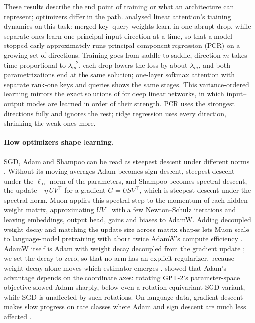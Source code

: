 These results describe the end point of training or what an architecture can represent; optimizers differ in the path. \citet{zhang2025training} analysed linear attention's training dynamics on this task: merged key--query weights learn in one abrupt drop, while separate ones learn one principal input direction at a time, so that a model stopped early approximately runs principal component regression (PCR) on a growing set of directions. Training goes from saddle to saddle, direction $m$ takes time proportional to $\lambda_m^{-2}$, each drop lowers the loss by about $\lambda_m$, and both parametrizations end at the same solution; one-layer softmax attention with separate rank-one keys and queries shows the same stages. This variance-ordered learning mirrors the exact solutions of \citet{saxe2014} for deep linear networks, in which input--output modes are learned in order of their strength. PCR uses the strongest directions fully and ignores the rest; ridge regression uses every direction, shrinking the weak ones more.

\paragraph{How optimizers shape learning.} SGD, Adam and Shampoo \citep{gupta2018shampoo} can be read as steepest descent under different norms \citep{bernstein2024old}. Without its moving averages Adam becomes sign descent, steepest descent under the $\ell_\infty$ norm of the parameters, and Shampoo becomes spectral descent, the update $-\eta\,UV^\top$ for a gradient $G = USV^\top$, which is steepest descent under the spectral norm. Muon \citep{jordan2024muon} applies this spectral step to the momentum of each hidden weight matrix, approximating $UV^\top$ with a few Newton--Schulz iterations and leaving embeddings, output head, gains and biases to AdamW. Adding decoupled weight decay and matching the update size across matrix shapes lets Muon scale to language-model pretraining with about twice AdamW's compute efficiency \citep{liu2025muon}. AdamW itself is Adam with weight decay decoupled from the gradient update \citep{loshchilov2019}; we set the decay to zero, so that no arm has an explicit regularizer, because weight decay alone moves which estimator emerges \citep{raventos2023}. \citet{xie2025adam} showed that Adam's advantage depends on the coordinate axes: rotating GPT-2's parameter-space objective slowed Adam sharply, below even a rotation-equivariant SGD variant, while SGD is unaffected by such rotations. On language data, gradient descent makes slow progress on rare classes where Adam and sign descent are much less affected \citep{kunstner2024heavy}.

